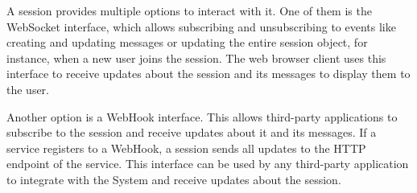 A session provides multiple options to interact with it. One of them is the WebSocket interface, which allows 
subscribing and unsubscribing to events like creating and updating messages or updating the entire session object, 
for instance, when a new user joins the session. The web browser client uses this interface to receive updates about 
the session and its messages to display them to the user.

Another option is a WebHook interface. This allows third-party applications to subscribe to the session and receive 
updates about it and its messages. If a service registers to a WebHook, a session sends all updates to the HTTP 
endpoint of the service. This interface can be used by any third-party application to integrate with the System and 
receive updates about the session.

